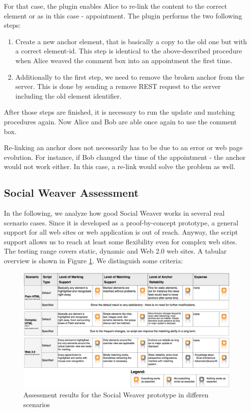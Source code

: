For that case, the plugin enables Alice to re-link the content to the correct element or as in this case - appointment. The plugin performs the two following steps:
\begin{enumerate}
	\item Create a new anchor element, that is basically a copy to the old one but with a correct element-id. This step is identical to the above-described procedure when Alice weaved the comment box into an appointment the first time. 
	\item  Additionally to the first step, we need to remove the broken anchor from the server. This is done by sending a remove REST request to the server including the old element identifier. 
\end{enumerate} 
After those steps are finished, it is necessary to run the update and matching procedures again. Now Alice and Bob are able once again to use the comment box. 

Re-linking an anchor does not necessarily has to be due to an error or web page evolution. For instance, if Bob changed the time of the appointment - the anchor would not work either. In this case, a re-link would solve the problem as well.

\newpage

\subsection{Social Weaver Assessment}\label{sowe-assessment}
In the following, we analyze how good Social Weaver works in several real scenario cases. Since it is developed as a proof-by-concept prototype, a general support for all web sites or web application is out of reach. Anyway, the script support allows us to reach at least some flexibility even for complex web sites. The testing range covers static, dynamic and Web 2.0 web sites. A tabular overview is shown in Figure \ref{assessments-results}. We distinguish some criteria:

\begin{figure}\centering
		\includegraphics[height=0.7\textwidth, angle=90]{images/assessments-results.png}
		\caption{Assessment results for the Social Weaver prototype in differen scenarios}
		\label{assessments-results}
\end{figure} 


